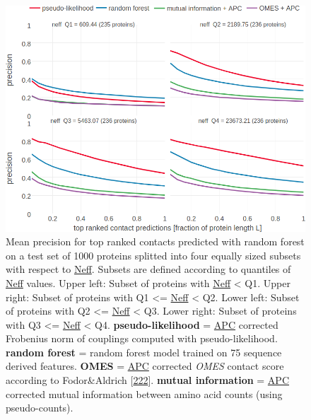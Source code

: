 \documentclass[11pt,a4paper,twoside]{book}
\theoremstyle{definition}
\theoremstyle{definition}
\theoremstyle{remark}
\begin{document}
\begin{figure}
\includegraphics[width=1\linewidth]{img/random_forest_contact_prior/precision_vs_rank_facetted_by_neff_notitle} \caption{Mean precision for top ranked contacts
predicted with random forest on a test set of 1000 proteins splitted
into four equally sized subsets with respect to
\protect\hyperlink{abbrev}{Neff}. Subsets are defined according to
quantiles of \protect\hyperlink{abbrev}{Neff} values. Upper left: Subset
of proteins with \protect\hyperlink{abbrev}{Neff} \textless{} Q1. Upper
right: Subset of proteins with Q1 \textless{}=
\protect\hyperlink{abbrev}{Neff} \textless{} Q2. Lower left: Subset of
proteins with Q2 \textless{}= \protect\hyperlink{abbrev}{Neff}
\textless{} Q3. Lower right: Subset of proteins with Q3 \textless{}=
\protect\hyperlink{abbrev}{Neff} \textless{} Q4.
\textbf{pseudo-likelihood} = \protect\hyperlink{abbrev}{APC} corrected
Frobenius norm of couplings computed with pseudo-likelihood.
\textbf{random forest} = random forest model trained on 75 sequence
derived features. \textbf{OMES} = \protect\hyperlink{abbrev}{APC}
corrected \emph{OMES} contact score according to Fodor\&Aldrich
{[}\protect\hyperlink{ref-Fodor2004a}{222}{]}. \textbf{mutual
information} = \protect\hyperlink{abbrev}{APC} corrected mutual
information between amino acid counts (using pseudo-counts).}\label{fig:performance-neff-rf}
\end{figure}
\end{document}
